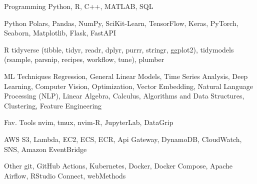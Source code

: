 

\begin{cvskills}

  \cvskill
    {Programming}
    {Python, R, C++, MATLAB, SQL}

  \cvskill
    {Python}
    {Polars, Pandas, NumPy, SciKit-Learn, TensorFlow, Keras, PyTorch, Seaborn, Matplotlib, Flask, FastAPI}

  \cvskill
    {R}
    {tidyverse (tibble, tidyr, readr, dplyr, purrr, stringr, ggplot2), tidymodels (rsample, parsnip, recipes, workflow, tune), plumber}

  \cvskill
    {ML Techniques}
    {Regression, General Linear Models, Time Series Analysis, Deep Learning, Computer Vision, Optimization, Vector Embedding, Natural Language Processing (NLP), Linear Algebra, Calculus, Algorithms and Data Structures, Clustering, Feature Engineering}

  \cvskill
    {Fav. Tools}
    {nvim, tmux, nvim-R, JupyterLab, DataGrip}

  \cvskill
    {AWS}
    {S3, Lambda, EC2, ECS, ECR, Api Gateway, DynamoDB, CloudWatch, SNS, Amazon EventBridge}

  \cvskill
    {Other}
    {git, GitHub Actions, Kubernetes, Docker, Docker Compose, Apache Airflow, RStudio Connect, webMethods}

\end{cvskills}
